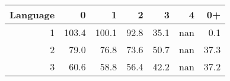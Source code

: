 \begin{tabular}{rrrrrrr}
\toprule
   Language &     0 &     1 &    2 &    3 &   4 &   0+ \\
\midrule
          1 & \num{103.4} & \num{100.1} & \num{92.8} & \num{35.1} & nan &  \num{0.1} \\
          2 &  \num{79.0} &  \num{76.8} & \num{73.6} & \num{50.7} & nan & \num{37.3} \\
          3 &  \num{60.6} &  \num{58.8} & \num{56.4} & \num{42.2} & nan & \num{37.2} \\
\bottomrule
\end{tabular}